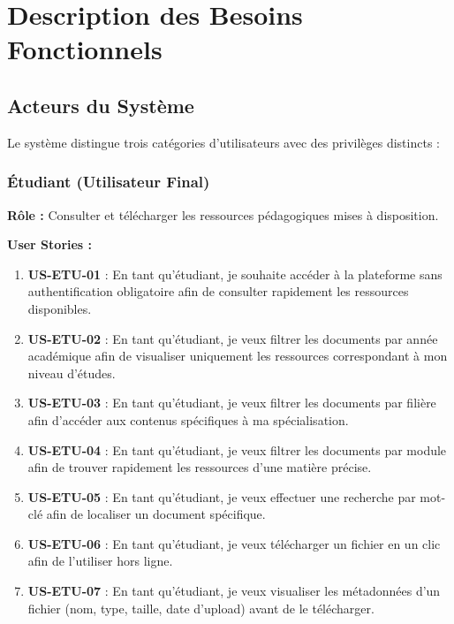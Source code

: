 \documentclass[12pt,a4paper]{article}
\begin{document}
\section{Description des Besoins Fonctionnels}

\subsection{Acteurs du Système}

Le système distingue trois catégories d'utilisateurs avec des privilèges distincts :

\subsubsection{Étudiant (Utilisateur Final)}

\textbf{Rôle :} Consulter et télécharger les ressources pédagogiques mises à disposition.

\textbf{User Stories :}
\begin{enumerate}[leftmargin=*]
    \item \textbf{US-ETU-01} : En tant qu'étudiant, je souhaite accéder à la plateforme sans authentification obligatoire afin de consulter rapidement les ressources disponibles.
    
    \item \textbf{US-ETU-02} : En tant qu'étudiant, je veux filtrer les documents par année académique afin de visualiser uniquement les ressources correspondant à mon niveau d'études.
    
    \item \textbf{US-ETU-03} : En tant qu'étudiant, je veux filtrer les documents par filière afin d'accéder aux contenus spécifiques à ma spécialisation.
    
    \item \textbf{US-ETU-04} : En tant qu'étudiant, je veux filtrer les documents par module afin de trouver rapidement les ressources d'une matière précise.
    
    \item \textbf{US-ETU-05} : En tant qu'étudiant, je veux effectuer une recherche par mot-clé afin de localiser un document spécifique.
    
    \item \textbf{US-ETU-06} : En tant qu'étudiant, je veux télécharger un fichier en un clic afin de l'utiliser hors ligne.
    
    \item \textbf{US-ETU-07} : En tant qu'étudiant, je veux visualiser les métadonnées d'un fichier (nom, type, taille, date d'upload) avant de le télécharger.
\end{enumerate}
\end{document}
